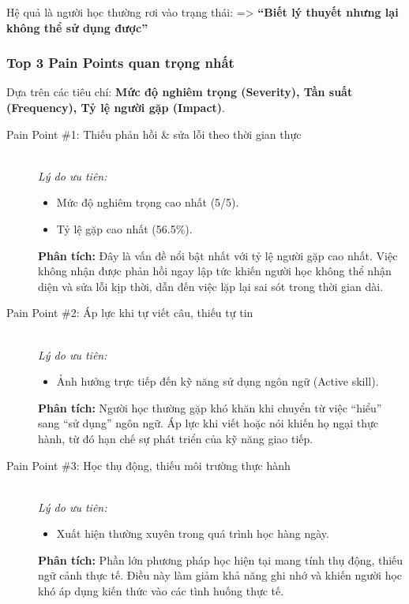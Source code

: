 Hệ quả là người học thường rơi vào trạng thái: \newline
=> \textbf{“Biết lý thuyết nhưng lại không thể sử dụng được”}

\subsubsection{Top 3 Pain Points quan trọng nhất}
Dựa trên các tiêu chí: \textbf{Mức độ nghiêm trọng (Severity), Tần suất (Frequency), Tỷ lệ người gặp (Impact)}.

\begin{description}
    \item[Pain Point \#1: Thiếu phản hồi \& sửa lỗi theo thời gian thực] \hfill \\
    \textit{Lý do ưu tiên:} 
    \begin{itemize}[nosep]
        \item Mức độ nghiêm trọng cao nhất (5/5).
        \item Tỷ lệ gặp cao nhất (56.5\%).
    \end{itemize}
    \textbf{Phân tích:} Đây là vấn đề nổi bật nhất với tỷ lệ người gặp cao nhất. Việc không nhận được phản hồi ngay lập tức khiến người học không thể nhận diện và sửa lỗi kịp thời, dẫn đến việc lặp lại sai sót trong thời gian dài.

    \item[Pain Point \#2: Áp lực khi tự viết câu, thiếu tự tin] \hfill \\
    \textit{Lý do ưu tiên:} 
    \begin{itemize}[nosep]
        \item Ảnh hưởng trực tiếp đến kỹ năng sử dụng ngôn ngữ (Active skill).
    \end{itemize}
    \textbf{Phân tích:} Người học thường gặp khó khăn khi chuyển từ việc “hiểu” sang “sử dụng” ngôn ngữ. Áp lực khi viết hoặc nói khiến họ ngại thực hành, từ đó hạn chế sự phát triển của kỹ năng giao tiếp.

    \item[Pain Point \#3: Học thụ động, thiếu môi trường thực hành] \hfill \\
    \textit{Lý do ưu tiên:} 
    \begin{itemize}[nosep]
        \item Xuất hiện thường xuyên trong quá trình học hàng ngày.
    \end{itemize}
    \textbf{Phân tích:} Phần lớn phương pháp học hiện tại mang tính thụ động, thiếu ngữ cảnh thực tế. Điều này làm giảm khả năng ghi nhớ và khiến người học khó áp dụng kiến thức vào các tình huống thực tế.
\end{description}

